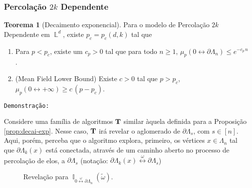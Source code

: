 \documentclass[9pt]{beamer}
\theoremstyle{definition} %
\newtheorem{mythm}{Teorema}
\DeclareMathOperator{\IX}{\mathbb{I}} %
\DeclareMathOperator{\LX}{\mathbb{L}} %
\begin{document}
	\begin{frame}[t]
	\frametitle{Percolação $2k$ Dependente}
	\begin{mythm}[Decaimento exponencial]\label{thm:decai-exp-2k}
		Para o modelo de Percolação $2k$ Dependente em $\LX^d$, existe $p_c = p_c(d, k)$ tal que
		\begin{enumerate}
			\item Para $p < p_c$, existe um $c_p > 0$ tal que para todo $n \geq 1$, $\mu_p(0 \leftrightarrow \partial\Lambda_n) \leq e^{-c_p \, n}$.
			\item (Mean Field Lower Bound) Existe $c > 0$ tal que $p > p_c$, $\mu_p(0 \leftrightarrow +\infty) \geq c \, (p - p_c)$.
			\end{enumerate}
		\end{mythm}\pause
			
		\vspace{-3pt}
		\texttt{Demonstração:}		
		
		\begin{minipage}[t]{0.50 \textwidth}
			Considere uma família de algoritmos $\text{\textbf{T}}$ similar àquela definida para a Proposição \ref{prop:decai-exp}. Nesse caso, $\text{\textbf{T}}$ irá revelar o aglomerado de $\partial\Lambda_{s}$, com $s \in [n]$. Aqui, porém, perceba que o algoritmo explora, primeiro, os vértices $x \in \Lambda_n$ tal que $\partial\Lambda_k(x)$ está conectada, através de um caminho aberto no processo de percolação de elos, a $\partial\Lambda_s$ (notação: $\partial\Lambda_k(x) \overset{\omega}{\leftrightarrow} \partial\Lambda_s$)
		\end{minipage}
		\begin{minipage}[t]{0.50 \textwidth}
			\begin{figure}
				\vspace{-7pt}
				
				\vspace{-9pt}
				\caption{\justifying Revelação para $\IX_{0\overset{\omega}{\leftrightarrow}\partial\Lambda_n}(\tilde{\omega})$.}
				\label{fig:caixa-k}
			\end{figure}
		\end{minipage}

	\end{frame}
\end{document}
